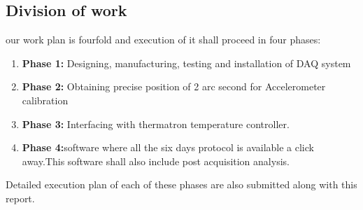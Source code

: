 \documentclass{FR16}
\begin{document}
\subsection{Division of work}
our work plan is fourfold and execution of it shall proceed in four phases:
\begin{enumerate}
    \item  \textbf{Phase 1:} Designing, manufacturing, testing and installation of DAQ system
    \item  \textbf{Phase 2:} Obtaining precise position of 2 arc second for Accelerometer calibration 
    \item \textbf{Phase 3:} Interfacing with thermatron temperature controller.
    \item \textbf{Phase 4:}software where all the six days protocol is available a click away.This software shall also include post acquisition analysis.
\end{enumerate}

Detailed execution plan of each of these phases are also submitted along with this report.
\end{document}
